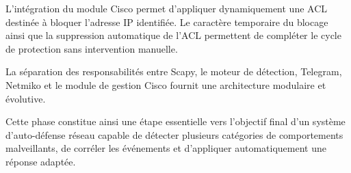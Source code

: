 L'intégration du module Cisco permet d'appliquer dynamiquement une ACL destinée à bloquer l'adresse IP identifiée. Le caractère temporaire du blocage ainsi que la suppression automatique de l'ACL permettent de compléter le cycle de protection sans intervention manuelle.

La séparation des responsabilités entre Scapy, le moteur de détection, Telegram, Netmiko et le module de gestion Cisco fournit une architecture modulaire et évolutive.

Cette phase constitue ainsi une étape essentielle vers l'objectif final d'un système d'auto-défense réseau capable de détecter plusieurs catégories de comportements malveillants, de corréler les événements et d'appliquer automatiquement une réponse adaptée.